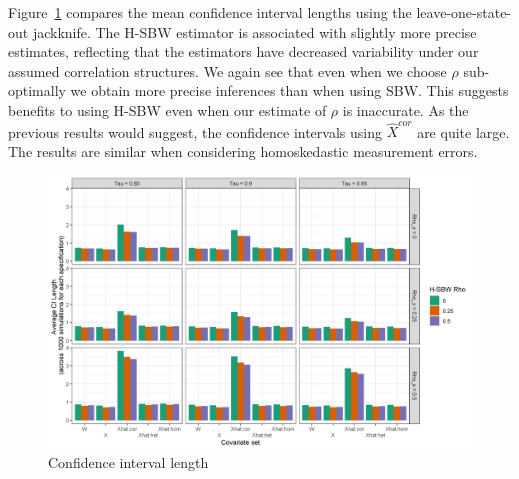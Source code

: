 Figure~\ref{fig:simcoverage2} compares the mean confidence interval lengths using the leave-one-state-out jackknife. The H-SBW estimator is associated with slightly more precise estimates, reflecting that the estimators have decreased variability under our assumed correlation structures. We again see that even when we choose $\rho$ sub-optimally we obtain more precise inferences than when using SBW. This suggests benefits to using H-SBW even when our estimate of $\rho$ is inaccurate. As the previous results would suggest, the confidence intervals using $\hat{X}^{cor}$ are quite large. The results are similar when considering homoskedastic measurement errors. 

\begin{figure}[H]
\begin{center}
    \caption{Confidence interval length}\label{fig:simcoverage2}
    \includegraphics[scale=0.5]{01_Plots/ci-length-plot.png}
\end{center}
\end{figure}

